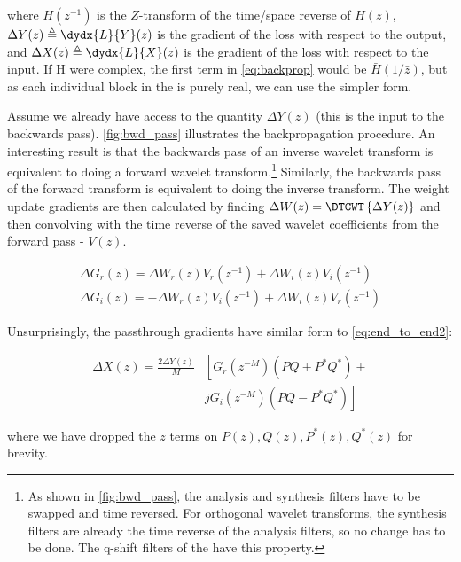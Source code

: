where $H(z^{-1})$ is the $Z$-transform of the time/space reverse of $H(z)$,
$\Delta Y(z) \triangleq \dydx{L}{Y}(z)$ is the gradient of the loss with respect
to the output, and $\Delta X(z) \triangleq \dydx{L}{X}(z)$ is the gradient of
the loss with respect to the input. If H were complex, the first term in
\autoref{eq:backprop} would be $\bar{H}(1/\bar{z})$, but as each individual
block in the \DTCWT is purely real, we can use the simpler form. 

Assume we already have access to the quantity $\Delta Y(z)$ (this is the input
to the backwards pass). \autoref{fig:bwd_pass} illustrates the backpropagation
procedure. An interesting result is that the backwards pass of an inverse
wavelet transform is equivalent to doing a forward wavelet
transform.\footnote{As shown in \autoref{fig:bwd_pass}, the analysis and
synthesis filters have to be swapped and time reversed. For orthogonal wavelet
transforms, the synthesis filters are already the time reverse of the analysis
filters, so no change has to be done. The q-shift filters of the \DTCWT
\cite{kingsbury_design_2003} have this property.} Similarly, the backwards pass
of the forward transform is equivalent to doing the inverse transform. The
weight update gradients are then calculated by finding $\Delta W(z) =
\DTCWT\left\{ \Delta Y(z) \right\}$ and then convolving with the time reverse of
the saved wavelet coefficients from the forward pass - $V(z)$.

\begin{gather}
  \Delta G_r(z) = \Delta W_r(z) V_r(z^{-1}) + \Delta W_i(z) V_i(z^{-1})  \label{eq:gr_update}\\
  \Delta G_i(z) =  -\Delta W_r(z) V_i(z^{-1}) + \Delta W_i(z) V_r(z^{-1})  \label{eq:gi_update} 
\end{gather}

Unsurprisingly, the passthrough gradients have similar form to
\autoref{eq:end_to_end2}:

\begin{equation}\label{eq:passthrough}
  \begin{split}
    \Delta X(z) = \frac{2\Delta Y(z)}{M} & \left[G_r(z^{-M})\left( PQ + P^*Q^* \right)\right. + \\
      & \left. jG_i(z^{-M}) \left(PQ-P^*Q^* \right) \right] 
\end{split}
\end{equation}

where we have dropped the $z$ terms on $P(z), Q(z), P^*(z), Q^*(z)$ for brevity.

